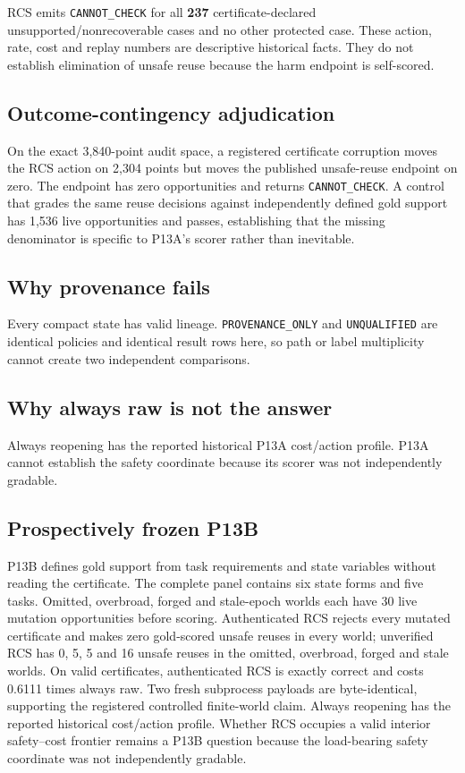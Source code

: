 RCS emits \texttt{CANNOT\_CHECK} for all \textbf{237}
certificate-declared unsupported/nonrecoverable cases and no other
protected case. These action, rate, cost and replay numbers are
descriptive historical facts. They do not establish elimination of
unsafe reuse because the harm endpoint is self-scored.

\subsection{Outcome-contingency
adjudication}\label{outcome-contingency-adjudication}

On the exact 3,840-point audit space, a registered certificate
corruption moves the RCS action on 2,304 points but moves the published
unsafe-reuse endpoint on zero. The endpoint has zero opportunities and
returns \texttt{CANNOT\_CHECK}. A control that grades the same reuse
decisions against independently defined gold support has 1,536 live
opportunities and passes, establishing that the missing denominator is
specific to P13A's scorer rather than inevitable.

\subsection{Why provenance fails}\label{why-provenance-fails}

Every compact state has valid lineage. \texttt{PROVENANCE\_ONLY} and
\texttt{UNQUALIFIED} are identical policies and identical result rows
here, so path or label multiplicity cannot create two independent
comparisons.

\subsection{Why always raw is not the
answer}\label{why-always-raw-is-not-the-answer}

Always reopening has the reported historical P13A cost/action profile.
P13A cannot establish the safety coordinate because its scorer was not
independently gradable.

\subsection{Prospectively frozen P13B}\label{prospectively-frozen-p13b}

P13B defines gold support from task requirements and state variables
without reading the certificate. The complete panel contains six state
forms and five tasks. Omitted, overbroad, forged and stale-epoch worlds
each have 30 live mutation opportunities before scoring. Authenticated
RCS rejects every mutated certificate and makes zero gold-scored unsafe
reuses in every world; unverified RCS has 0, 5, 5 and 16 unsafe reuses
in the omitted, overbroad, forged and stale worlds. On valid
certificates, authenticated RCS is exactly correct and costs 0.6111
times always raw. Two fresh subprocess payloads are byte-identical,
supporting the registered controlled finite-world claim. Always
reopening has the reported historical cost/action profile. Whether RCS
occupies a valid interior safety--cost frontier remains a P13B question
because the load-bearing safety coordinate was not independently
gradable.
